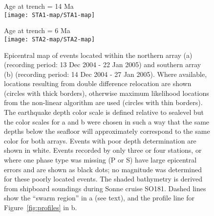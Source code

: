 \documentclass[reviewcopy]{elsarticle}
\renewcommand{\includegraphics}[2][]{\fbox{#2}}
\begin{document}
\begin{figure}
\begin{minipage}[t]{0.49\textwidth}
{ Age at trench = 14 Ma} \\
\texttt{[image: STA1-map/STA1-map]}
\end{minipage}\hfill%
\begin{minipage}[t]{0.49\textwidth}
{  Age at trench = 6 Ma} \\
\texttt{[image: STA2-map/STA2-map]}
\end{minipage}

\caption{Epicentral map of events located within the northern array
  (a) (recording period: 13 Dec 2004 - 22 Jan 2005) and southern array
  (b)  (recording period: 14 Dec 2004 - 27 Jan 2005). Where available, locations resulting
  from double difference relocation are shown (circles with thick
  borders), otherwise maximum likelihood locations from the non-linear
   algorithm are used (circles with thin borders).
  The earthquake depth color scale is defined relative to sealevel but
  the color scales for a and b were chosen in such a way that the same depths
  below the seafloor will approximately correspond to the same color
  for both arrays.    Events
  with poor depth determination are shown in white. Events recorded by
  only three or four stations, or where one phase type was missing (P
  or S) have large epicentral errors and are shown as black dots; no
  magnitude was determined for these poorly located events.
  The shaded bathymetry is derived from shipboard
soundings during Sonne cruise SO181.  Dashed lines show the ``swarm
region'' in a (see text), and the profile line for
Figure~\protect\ref{fig:profiles} in b.}
\label{fig:epimaps}
\end{figure}
\end{document}
